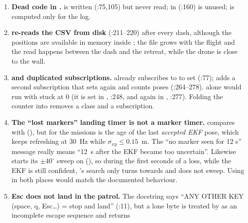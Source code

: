 \begin{review}
\begin{enumerate}[leftmargin=*]
  \item \textbf{Dead code in .}  is written
        (:75,105) but never read;  in  (:160) is
        unused;  is computed only for the log.
  \item \textbf{ re-reads the CSV from disk} (:211--220) after every dash,
        although the positions are available in memory inside ; the file grows with the flight and
        the read happens between the dash and the retreat, while the drone is close to the wall.
  \item \textbf{ and duplicated  subscriptions.}  already
        subscribes to  to set  (:77);
         adds a second subscription that sets  again and counts poses
        (:264--278).  alone would run with  stuck at 0 (it is set in
        , :248, and again in , :277). Folding the counter into
         removes a class and a subscription.
  \item \textbf{The ``lost markers'' landing timer is not a marker timer.}  compares
         with  (), but for the missions
         is the age of the last \emph{accepted EKF} pose, which keeps refreshing at 30~Hz while
        $\sigma_{xy} \le 0.15$~m. The ``no marker seen for 12 s'' message really means ``12~s after the EKF
        became too uncertain''. Likewise  starts its $\pm40^\circ$ sweep on
         (), so during the first seconds of a loss, while the EKF is
        still confident, 's search only turns towards  and does not sweep. Using
         in both places would match the documented behaviour.
  \item \textbf{Esc does not land in the patrol.} The docstring says ``ANY OTHER KEY (space, q, Esc\dots) = stop
        and land'' (:11), but a lone  byte is treated by  as an
        incomplete escape sequence and  returns 

\end{enumerate}
\end{review}
